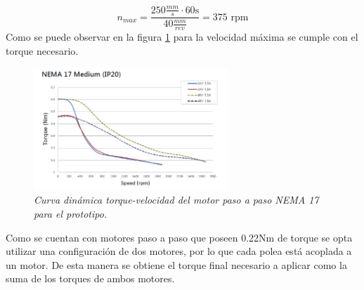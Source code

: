 \begin{equation}
    n_{max} = \frac{250 \frac{mm}{s} \cdot 60 \text {s}}{40 \frac{mm}{rev}} = 375 \text{ rpm}
\end{equation}
Como se puede observar en la figura \ref{fig:Curva_din_nema17medium} para la velocidad máxima se cumple con el torque necesario.
\begin{figure}[H]
    \centering
    \includegraphics[width=0.65\textwidth]{img/nema17_medium.png}
    \caption{\textit{Curva dinámica torque-velocidad del motor paso a paso NEMA 17 para el prototipo.}}
    \label{fig:Curva_din_nema17medium}
\end{figure}
Como se cuentan con motores paso a paso que poseen 0.22Nm de torque se opta utilizar una configuración de dos motores, por lo que cada polea está acoplada a un motor. De esta manera se obtiene el torque final necesario a aplicar como la suma de los torques de ambos motores.